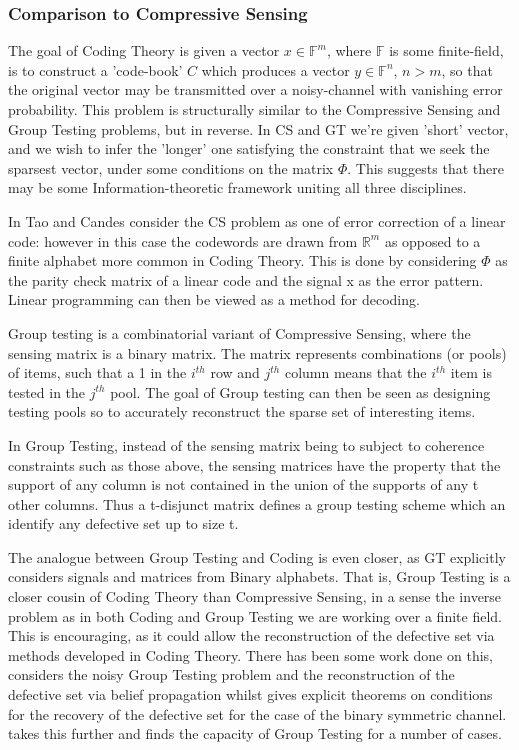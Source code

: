 \subsubsection{Comparison to Compressive Sensing}
The goal of Coding Theory is given a vector \(x \in \mathbb{F}^m\), where \(\mathbb{F}\) is some finite-field, is to construct a 'code-book' \(C\) which produces a vector \(y \in \mathbb{F}^n\), \(n > m\), so that the original vector may be transmitted over a noisy-channel with vanishing error probability. This problem is structurally similar to the Compressive Sensing and Group Testing problems, but in reverse. In CS and GT we're given 'short' vector, and we wish to infer the 'longer' one satisfying the constraint that we seek the sparsest vector, under some conditions on the matrix \(\Phi\). This suggests that there may be some Information-theoretic framework uniting all three disciplines. 

In \cite{Emma} Tao and Candes consider the CS problem as one of error correction of a linear code: however in this case the codewords are drawn from \(\mathbb{R}^m\) as opposed to a finite alphabet more common in Coding Theory. This is done by considering \(\Phi\) as the parity check matrix of a linear code and the signal x as the error pattern. Linear programming can then be viewed as a method for decoding. 

Group testing is a combinatorial variant of Compressive Sensing, where the sensing matrix is a binary matrix. The matrix represents combinations (or pools) of items, such that a 1 in the \(i^{th}\) row and \(j^{th}\) column means that  the \(i^{th}\) item is tested in the \(j^{th}\) pool. The goal of Group testing can then be seen as designing testing pools so to accurately reconstruct the sparse set of interesting items. 

In Group Testing, instead of the sensing matrix being to subject to coherence constraints such as those above, the sensing matrices have the property that the support of any column is not contained in the union of the supports of any t other columns. Thus a t-disjunct matrix defines a group testing scheme which an identify any defective set up to size t.

The analogue between Group Testing and Coding is even closer, as GT explicitly considers signals and matrices from Binary alphabets. That is, Group Testing is a closer cousin of Coding Theory than Compressive Sensing, in a sense the inverse problem as in both Coding and Group Testing we are working over a finite field. This is encouraging, as it could allow the reconstruction of the defective set via methods developed in Coding Theory. There has been some work done on this, \cite{Sejdinovic2010} considers the noisy Group Testing problem and the reconstruction of the defective set via belief propagation whilst \cite{Wadayama2013} gives explicit theorems on conditions for the recovery of the defective set for the case of the binary symmetric channel. \cite{Baldassini2013} takes this further and finds the capacity of Group Testing for a number of cases. 

